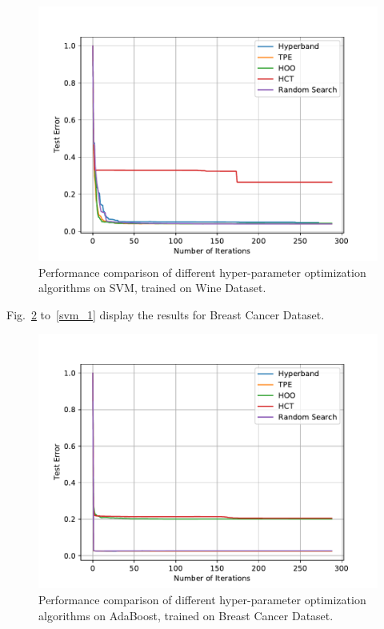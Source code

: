 \documentclass[runningheads,a4paper]{llncs}
\begin{document}
\begin{figure}[ht]
    \centering
    \includegraphics[scale=0.8]{img/uci/svm_0.pdf}
    \caption{Performance comparison of different hyper-parameter optimization algorithms on SVM, trained on Wine Dataset.}
    \label{svm_0}
\end{figure}

Fig.~\ref{ada_1} to~\ref{svm_1} display the results for Breast Cancer Dataset.

\begin{figure}[ht]
    \centering
    \includegraphics[scale=0.8]{img/uci/ada_1.pdf}
    \caption{Performance comparison of different hyper-parameter optimization algorithms on AdaBoost, trained on Breast Cancer Dataset.}
    \label{ada_1}
\end{figure}
\end{document}
